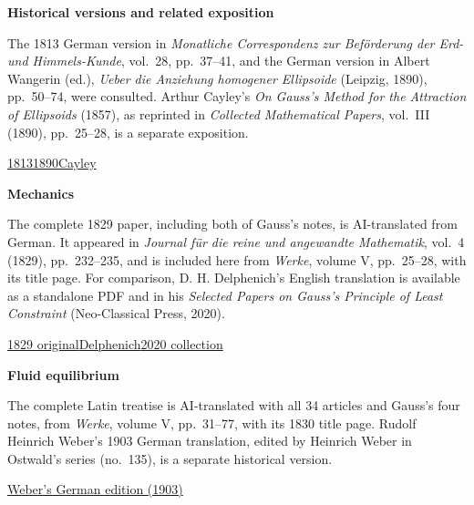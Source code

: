 \noindent\textbf{Historical versions and related exposition}\par\smallskip
\noindent The 1813 German version in \textit{Monatliche Correspondenz zur Beförderung der Erd- und Himmels-Kunde}, vol.~28, pp.~37--41, and the German version in Albert Wangerin (ed.), \textit{Ueber die Anziehung homogener Ellipsoide} (Leipzig, 1890), pp.~50--74, were consulted. Arthur Cayley’s \textit{On Gauss’s Method for the Attraction of Ellipsoids} (1857), as reprinted in \textit{Collected Mathematical Papers}, vol.~III (1890), pp.~25--28, is a separate exposition.
\par\medskip
\noindent \href{https://www.digitale-sammlungen.de/de/view/bsb10538617?page=43}{1813}\quad\href{https://archive.org/details/ueberdieanziehu00wanggoog}{1890}\quad\href{https://rcin.org.pl/dlibra/publication/184416/edition/170906/on-gauss-method-for-the-attraction-of-ellipsoids-cayley-arthur-1821-1895?language=en}{Cayley}
\par\medskip
\noindent\textbf{Mechanics}\par\smallskip
\noindent The complete 1829 paper, including both of Gauss’s notes, is AI-translated from German. It appeared in \textit{Journal für die reine und angewandte Mathematik}, vol.~4 (1829), pp.~232--235, and is included here from \textit{Werke}, volume V, pp.~25--28, with its title page. For comparison, D. H. Delphenich’s English translation is available as a standalone PDF and in his \textit{Selected Papers on Gauss’s Principle of Least Constraint} (Neo-Classical Press, 2020).
\par\medskip
\noindent \href{https://doi.org/10.1515/crll.1829.4.232}{1829 original}\quad\href{https://www.neo-classical-physics.info/uploads/3/4/3/6/34363841/gauss_-_princ_least_constraint.pdf}{Delphenich}\quad\href{https://www.neo-classical-physics.info/uploads/3/4/3/6/34363841/selecta_on_least_constraint.pdf#page=95}{2020 collection}
\par\medskip
{}
\noindent\textbf{Fluid equilibrium}\par\smallskip
\noindent The complete Latin treatise is AI-translated with all 34 articles and Gauss’s four notes, from \textit{Werke}, volume V, pp.~31--77, with its 1830 title page. Rudolf Heinrich Weber’s 1903 German translation, edited by Heinrich Weber in Ostwald’s series (no.~135), is a separate historical version.
\par\smallskip
\noindent \href{https://archive.org/details/allgemeinegrund00gausgoog}{Weber’s German edition (1903)}
\par\endgroup
\clearpage
